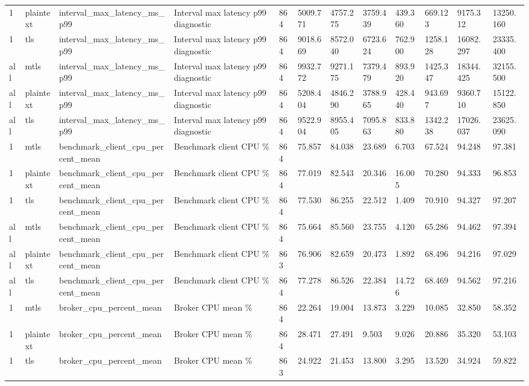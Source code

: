 \begin{longtable}{llllllllllll}
1 & plaintext & interval\_max\_latency\_ms\_p99 & Interval max latency p99 diagnostic & 864 & 5009.771 & 4757.275 & 3759.439 & 439.360 & 669.123 & 9175.312 & 13250.160 \\
1 & tls & interval\_max\_latency\_ms\_p99 & Interval max latency p99 diagnostic & 864 & 9018.669 & 8572.040 & 6723.624 & 762.900 & 1258.128 & 16082.297 & 23335.400 \\
all & mtls & interval\_max\_latency\_ms\_p99 & Interval max latency p99 diagnostic & 864 & 9932.772 & 9271.175 & 7379.479 & 893.920 & 1425.347 & 18344.425 & 32155.500 \\
all & plaintext & interval\_max\_latency\_ms\_p99 & Interval max latency p99 diagnostic & 864 & 5208.404 & 4846.290 & 3788.965 & 428.440 & 943.697 & 9360.710 & 15122.850 \\
all & tls & interval\_max\_latency\_ms\_p99 & Interval max latency p99 diagnostic & 864 & 9522.904 & 8955.405 & 7095.863 & 833.880 & 1342.238 & 17026.037 & 23625.090 \\
1 & mtls & benchmark\_client\_cpu\_percent\_mean & Benchmark client CPU \% & 864 & 75.857 & 84.038 & 23.689 & 6.703 & 67.524 & 94.248 & 97.381 \\
1 & plaintext & benchmark\_client\_cpu\_percent\_mean & Benchmark client CPU \% & 864 & 77.019 & 82.543 & 20.346 & 16.005 & 70.280 & 94.333 & 96.853 \\
1 & tls & benchmark\_client\_cpu\_percent\_mean & Benchmark client CPU \% & 864 & 77.530 & 86.255 & 22.512 & 1.409 & 70.910 & 94.327 & 97.207 \\
all & mtls & benchmark\_client\_cpu\_percent\_mean & Benchmark client CPU \% & 864 & 75.664 & 85.560 & 23.755 & 4.120 & 65.286 & 94.462 & 97.394 \\
all & plaintext & benchmark\_client\_cpu\_percent\_mean & Benchmark client CPU \% & 863 & 76.906 & 82.659 & 20.473 & 1.892 & 68.496 & 94.216 & 97.029 \\
all & tls & benchmark\_client\_cpu\_percent\_mean & Benchmark client CPU \% & 864 & 77.278 & 86.526 & 22.384 & 14.726 & 68.469 & 94.562 & 97.216 \\
1 & mtls & broker\_cpu\_percent\_mean & Broker CPU mean \% & 864 & 22.264 & 19.004 & 13.873 & 3.229 & 10.085 & 32.850 & 58.352 \\
1 & plaintext & broker\_cpu\_percent\_mean & Broker CPU mean \% & 864 & 28.471 & 27.491 & 9.503 & 9.026 & 20.886 & 35.320 & 53.103 \\
1 & tls & broker\_cpu\_percent\_mean & Broker CPU mean \% & 863 & 24.922 & 21.453 & 13.800 & 3.295 & 13.520 & 34.924 & 59.822 \\

\end{longtable}
